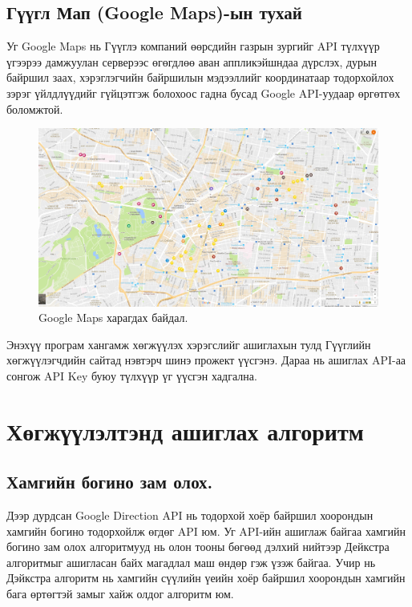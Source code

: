 \subsection{Гүүгл Мап (Google Maps)-ын тухай}
Уг Google Maps нь Гүүглэ компаний өөрсдийн газрын зургийг API түлхүүр үгээрээ дамжуулан серверээс өгөгдлөө аван аппликэйшндаа дүрслэх, дурын байршил заах, хэрэглэгчийн байршилын мэдээллийг координатаар тодорхойлох зэрэг үйлдлүүдийг гүйцэтгэж болохоос гадна бусад Google API-уудаар өргөтгөх боломжтой.
\begin{figure}[H]
    \centering
	\includegraphics[width=\textwidth]{Figures/sudalgaa/Google-Maps.jpg}
	\caption{Google Maps харагдах байдал.}
	\label{fig:Google-Maps}
\end{figure}
Энэхүү програм хангамж хөгжүүлэх хэрэгслийг ашиглахын тулд Гүүглийн хөгжүүлэгчдийн сайтад нэвтэрч шинэ прожект үүсгэнэ. Дараа нь ашиглах API-аа сонгож API Key буюу түлхүүр үг үүсгэн хадгална.

\section{Хөгжүүлэлтэнд ашиглах алгоритм}

\subsection{Хамгийн богино зам олох.}
Дээр дурдсан Google Direction API нь тодорхой хоёр байршил хоорондын хамгийн богино тодорхойлж өгдөг API юм.
Уг API-ийн ашиглаж байгаа хамгийн богино зам олох алгоритмууд нь олон тооны бөгөөд дэлхий нийтээр Дейкстра алгоритмыг ашигласан байх магадлал маш өндөр гэж үзэж байгаа.
Учир нь Дэйкстра алгоритм нь хамгийн сүүлийн үеийн хоёр байршил хоорондын хамгийн бага өртөгтэй замыг хайж олдог алгоритм юм.  

